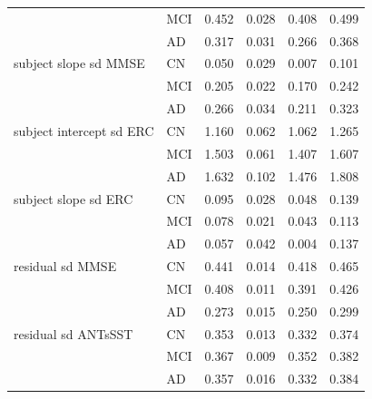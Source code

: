 \documentclass[12pt]{article}
\begin{document}
\begin{table}[H]
\begin{tabular}{|l|l|r|r|r|r|}
  & MCI & 0.452 & 0.028 & 0.408 & 0.499 \\ 
  & AD & 0.317 & 0.031 & 0.266 & 0.368 \\ 
  subject slope sd MMSE & CN & 0.050 & 0.029 & 0.007 & 0.101 \\ 
  & MCI & 0.205 & 0.022 & 0.170 & 0.242 \\ 
  & AD & 0.266 & 0.034 & 0.211 & 0.323 \\ 
  subject intercept sd ERC & CN & 1.160 & 0.062 & 1.062 & 1.265 \\ 
  & MCI & 1.503 & 0.061 & 1.407 & 1.607 \\ 
  & AD & 1.632 & 0.102 & 1.476 & 1.808 \\ 
  subject slope sd ERC & CN & 0.095 & 0.028 & 0.048 & 0.139 \\ 
  & MCI & 0.078 & 0.021 & 0.043 & 0.113 \\ 
  & AD & 0.057 & 0.042 & 0.004 & 0.137 \\ 
  residual sd MMSE & CN & 0.441 & 0.014 & 0.418 & 0.465 \\ 
  & MCI & 0.408 & 0.011 & 0.391 & 0.426 \\ 
  & AD & 0.273 & 0.015 & 0.250 & 0.299 \\ 
  residual sd ANTsSST & CN & 0.353 & 0.013 & 0.332 & 0.374 \\ 
  & MCI & 0.367 & 0.009 & 0.352 & 0.382 \\ 
  & AD & 0.357 & 0.016 & 0.332 & 0.384 \\
  \hline
\end{tabular}
\end{table}
\end{document}

